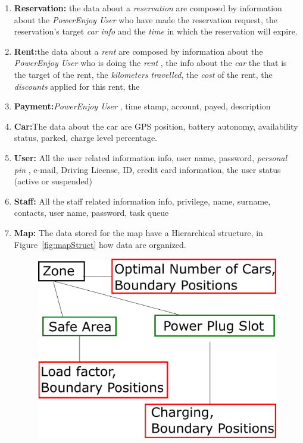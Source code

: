\documentclass[english]{article}
\newcommand{\rent}{\textit{rent }}
\newcommand{\powerenjoyuser}{\textit{PowerEnjoy User }}
\newcommand{\reservation}{\textit{reservation }}
\newcommand{\personalpin}{\textit{personal pin }}
\begin{document}
\begin {enumerate}
	\item \textbf{Reservation:} the data about a \reservation are composed by information about the \powerenjoyuser who have made the reservation request, the reservation's target \textit{car info} and the \textit{time} in which the reservation will expire. 
	\item \textbf{Rent:}the data about a \rent are composed by information about the \powerenjoyuser who is doing the \rent, the info about the \textit{car} the that is the target of the rent, the \textit{kilometers travelled}, the \textit{cost} of the rent, the \textit{discounts} applied for this rent, the \
	\item \textbf{Payment:}\powerenjoyuser, time stamp, account, payed, description
	\item  \textbf {Car:}The data about the car are GPS position, battery autonomy, availability status, parked, charge level percentage.
	\item  \textbf{User:} All the user related information info, user name, password, \personalpin, e-mail, Driving License, ID, credit card information, the user status (active or suspended)
	\item  \textbf{Staff:} All the staff related information info, privilege, name, surname, contacts, user name, password, task queue
	\item  \textbf{Map:} The data stored for the map have a Hierarchical structure, in Figure~\ref{fig:mapStruct} how data are organized.
			\begin{figure}[H]
				\centering
				\includegraphics[scale=0.4]{Images/mapStruct.pdf}%

\end{figure}
\end{enumerate}
\end{document}
